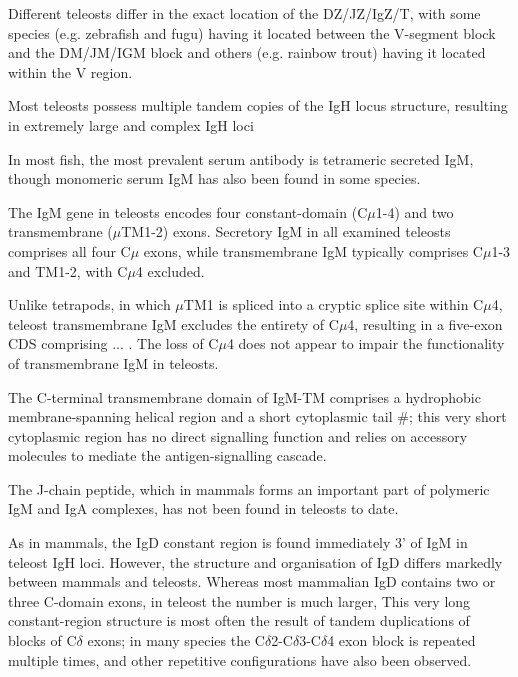 Different teleosts differ in the exact location of the DZ/JZ/IgZ/T, with some species (e.g. zebrafish and fugu) having it located between the V-segment block and the DM/JM/IGM block and others (e.g. rainbow trout) having it located within the V region.

Most teleosts possess multiple tandem copies of the IgH locus structure, resulting in extremely large and complex IgH loci%


In most fish, the most prevalent serum antibody is tetrameric secreted IgM, though monomeric serum IgM has also been found in some species.

The IgM gene in teleosts encodes four constant-domain (C$\mu$1-4) and two transmembrane ($\mu$TM1-2) exons. Secretory IgM in all examined teleosts comprises all four C$\mu$ exons, while transmembrane IgM typically comprises C$\mu$1-3 and TM1-2, with C$\mu$4 excluded. %

Unlike tetrapods, in which $\mu$TM1 is spliced into a cryptic splice site within C$\mu$4, teleost transmembrane IgM excludes the entirety of C$\mu$4, resulting in a five-exon CDS comprising ... . The loss of C$\mu$4 does not appear to impair the functionality of transmembrane IgM in teleosts.

The C-terminal transmembrane domain of IgM-TM comprises a hydrophobic membrane-spanning helical region %
and a short cytoplasmic tail %
#; this very short cytoplasmic region has no direct signalling function and relies on accessory molecules to mediate the antigen-signalling cascade. %

The J-chain peptide, which in mammals forms an important part of polymeric IgM and IgA complexes, has not been found in teleosts to date.

As in mammals, the IgD constant region is found immediately 3' of IgM in teleost IgH loci. However, the structure and organisation of IgD differs markedly between mammals and teleosts. Whereas most mammalian IgD contains two or three C-domain exons, in teleost the number is much larger, %
This very long constant-region structure is most often the result of tandem duplications of blocks of C$\delta$ exons; in many species the C$\delta$2-C$\delta$3-C$\delta$4 exon block is repeated multiple times, and other repetitive configurations have also been observed. 


